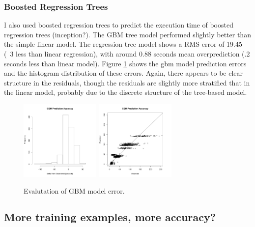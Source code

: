 \documentclass[a4paper]{article}
\begin{document}
\subsubsection{Boosted Regression Trees}
I also used boosted regression trees to predict the execution time of boosted regression trees (inception?).  The GBM tree model performed slightly better than the simple linear model.  The regression tree model shows a RMS error of 19.45 (~3 less than linear regression), with around 0.88 seconds mean overprediction (.2 seconds less than linear model).  Figure \ref{fig:gbm_hist} shows the gbm model prediction errors and the histogram distribution of these errors.  Again, there appears to be clear structure in the residuals, though the residuals are slightly more stratified that in the linear model, probably due to the discrete structure of the tree-based model.

\begin{figure}
\begin{centering}
\includegraphics[width=0.35\textwidth]{gbm_hist.png}
\includegraphics[width=0.35\textwidth]{GBM_acc.png}
\caption{\label{fig:gbm_hist} Evalutation of GBM model error.}
\end{centering}
\end{figure}


\subsection{More training examples, more accuracy?}
\end{document}
